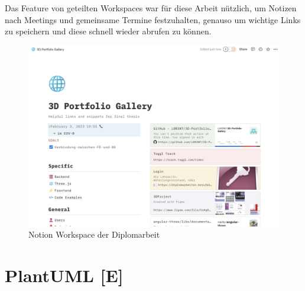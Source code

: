 Das Feature von geteilten Workspaces war für diese Arbeit nützlich, um Notizen nach Meetings und gemeinsame Termine festzuhalten, genauso um wichtige Links zu speichern und diese schnell wieder abrufen zu können.

\begin{figure} [h t]
  \centering
  \includegraphics[scale=0.3]{pics/NotionPage.png}
  \caption{Notion Workspace der Diplomarbeit}
  \label{fig:tech:notion-page}
\end{figure}

\section{PlantUML [E]}
